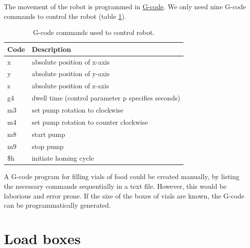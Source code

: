 \documentclass[]{book}
\theoremstyle{definition}
\theoremstyle{definition}
\theoremstyle{definition}
\theoremstyle{remark}
\begin{document}
The movement of the robot is programmed in
\href{https://en.wikipedia.org/wiki/G-code}{G-code}. We only need nine
G-code commands to control the robot (table \ref{tab:gCodes}).

\begin{table}

\caption{\label{tab:gCodes}G-code commands used to control robot.}
\centering
\begin{tabular}[t]{ll}
\toprule
Code & Description\\
\midrule
x & absolute position of x-axis\\
y & absolute position of y-axis\\
z & absolute position of z-axis\\
g4 & dwell time (control parameter p specifies seconds)\\
m3 & set pump rotation to clockwise\\
\addlinespace
m4 & set pump rotation to counter clockwise\\
m8 & start pump\\
m9 & stop pump\\
\$h & initiate homing cycle\\
\bottomrule
\end{tabular}
\end{table}

A G-code program for filling vials of food could be created manually, by
listing the necessary commands sequentially in a text file. However,
this would be laborious and error prone. If the size of the boxes of
vials are known, the G-code can be programmatically generated.

\section{Load boxes}\label{loadBoxes}
\end{document}
